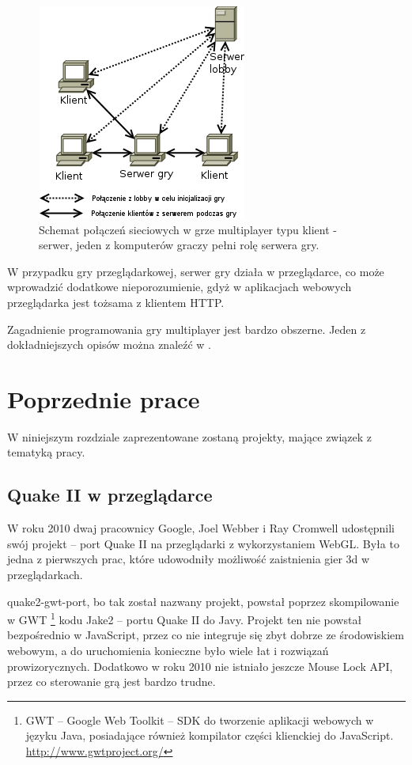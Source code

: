 \begin{figure}[h]
  \centering
  \includegraphics[scale=1]{zasoby/rozdzial2/multiplayer}  
  \caption{Schemat połączeń sieciowych w grze multiplayer typu klient - serwer, jeden z komputerów graczy pełni rolę serwera gry.}
  \label{fig:multiplayer}
\end{figure}

W przypadku gry przeglądarkowej, serwer gry działa w przeglądarce, co może
wprowadzić dodatkowe nieporozumienie, gdyż w aplikacjach webowych przeglądarka
jest tożsama z klientem HTTP.

Zagadnienie programowania gry multiplayer jest bardzo obszerne. Jeden z dokładniejszych
opisów można znaleźć w \cite{algorithms-networking}.


\section{Poprzednie prace}
\label{sec:poprzedniePrace}

W niniejszym rozdziale zaprezentowane zostaną projekty, mające związek z tematyką pracy.

\subsection{Quake II w przeglądarce}
\label{ssec:quake2web}

W roku 2010 dwaj pracownicy Google, Joel Webber i Ray Cromwell
udostępnili swój projekt -- port Quake II
na przeglądarki z wykorzystaniem WebGL. Była to jedna z pierwszych prac,
które udowodniły możliwość zaistnienia gier 3d w przeglądarkach.

quake2-gwt-port, bo tak został nazwany projekt, powstał poprzez skompilowanie
w GWT \footnote{GWT -- Google Web Toolkit -- SDK do tworzenie aplikacji webowych w języku Java,
  posiadające również kompilator części klienckiej do JavaScript.
  \url{http://www.gwtproject.org/} }
kodu Jake2 -- portu Quake II do Javy.
Projekt ten nie powstał bezpośrednio w JavaScript, przez co nie integruje się
zbyt dobrze ze środowiskiem webowym, a do uruchomienia konieczne było
wiele łat i rozwiązań prowizorycznych. Dodatkowo w roku 2010 nie istniało
jeszcze Mouse Lock API, przez co sterowanie grą jest bardzo trudne.

